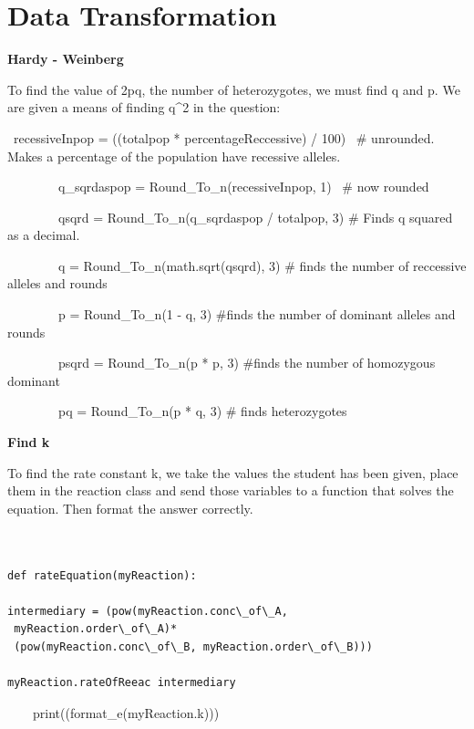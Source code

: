 \documentclass[a4paper,12pt]{report}
\begin{document}
\bigskip


\bigskip

\section{Data Transformation}


\bigskip


\bigskip
\begin{flushleft}
\textbf{Hardy - Weinberg}

To find the value of 2pq, the number of heterozygotes, we must find q and p. We are given a means of finding q\^{}2 in the question:
\end{flushleft}
\ recessiveInpop = ((totalpop * percentageReccessive) / 100) \ \# unrounded. Makes a percentage of the population have recessive alleles.

\ \ \ \ \ \ \ \ q\_sqrdaspop = Round\_To\_n(recessiveInpop, 1) \ \# now rounded

\ \ \ \ \ \ \ \ qsqrd = Round\_To\_n(q\_sqrdaspop / totalpop, 3) \# Finds q squared as a decimal.

\ \ \ \ \ \ \ \ q = Round\_To\_n(math.sqrt(qsqrd), 3) \# finds the number of reccessive alleles and rounds

\ \ \ \ \ \ \ \ p = Round\_To\_n(1 - q, 3) \#finds the number of dominant alleles and rounds

\ \ \ \ \ \ \ \ psqrd = Round\_To\_n(p * p, 3) \#finds the number of homozygous dominant

\ \ \ \ \ \ \ \ pq = Round\_To\_n(p * q, 3) \# finds heterozygotes\\
\begin{flushleft}

\textbf{Find k}

To find the rate constant k, we take the values the student has been given, place them in the reaction class and send those variables to a function that solves the equation. Then format the answer correctly.
\end{flushleft}

\begin{verbatim}


def rateEquation(myReaction):

intermediary = (pow(myReaction.conc\_of\_A,
 myReaction.order\_of\_A)* 
 (pow(myReaction.conc\_of\_B, myReaction.order\_of\_B)))

myReaction.rateOfReeac intermediary
\end{verbatim}
\ \ \ \ print((format\_e(myReaction.k)))
\end{document}
